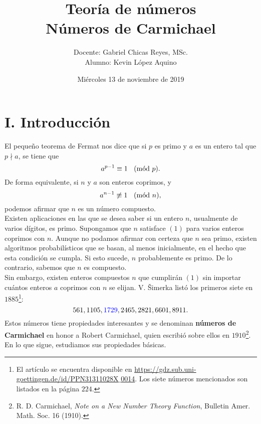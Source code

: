 \documentclass{article}
\theoremstyle{definition}
\newcommand{\Mod}[1]{\ \hspace{0.2cm} (\mathrm{m\acute{o}d}\ #1)}
\begin{document}
\date{Miércoles 13 de noviembre de 2019}
\title{ \textbf{Teoría de números}  \\
 Números de Carmichael}
\author{Docente: Gabriel Chicas Reyes, MSc.\\ 
				Alumno: Kevin López Aquino }

\maketitle 
\vspace{0.3cm}
\section*{I. Introducción}
\vspace{0.5cm}
El pequeño teorema de Fermat nos dice que si $p$ es primo y $a$ es un entero tal que $p \nmid a$, se tiene que 
\begin{equation}
a^{p-1} \equiv 1 \Mod{p}. 
\end{equation} 
De forma equivalente, si $n$ y $a$ son enteros coprimos, y
$$ a^{n - 1} \not \equiv 1 \Mod{n}, $$
podemos afirmar que $n$ es un número compuesto. \\

Existen aplicaciones en las que se desea saber si un entero $n$, usualmente de varios dígitos, es primo. Supongamos que $n$ satisface $(1)$ para varios enteros coprimos con $n$. Aunque no podamos afirmar con certeza que $n$ sea primo, existen algoritmos probabilísticos que se basan, al menos inicialmente, en el hecho que esta condición se cumpla. Si esto sucede, $n$ probablemente es primo. De lo contrario, sabemos que $n$ es compuesto. \\

Sin embargo, existen enteros compuestos $n$ que cumplirán $(1)$ sin importar cuántos enteros $a$ coprimos con $n$ se elijan.  V. Šimerka listó los primeros siete en $1885$\footnote{El artículo se encuentra disponible en \href{https://gdz.sub.uni-goettingen.de/id/PPN31311028X_0014}{https://gdz.sub.uni-goettingen.de/id/PPN31311028X$\_$0014}. Los siete números mencionados son listados en la página $224$.}:
$$561, 1105, \textcolor{blue}{1729}, 2465, 2821, 6601, 8911.$$Estos números tiene propiedades interesantes y se denominan \textbf{números de Carmichael} en honor a Robert Carmichael, quien escribió sobre ellos en $1910$\footnote{R. D. Carmichael, \textit{Note on a New Number Theory Function}, Bulletin Amer. Math. Soc. 16 (1910).}. 
En lo que sigue, estudiamos sus propiedades básicas. 
\newpage
\end{document}
